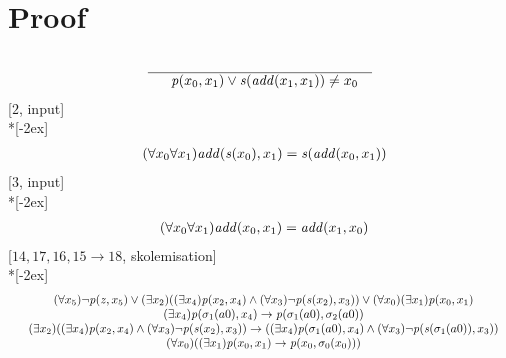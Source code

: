 \documentclass[fleqn]{article}
\newenvironment{VampireProof}{%
   \section{Proof}}{}
\newenvironment{VampireInference}{%
   \begin{array}{c}}{\end{array}}
\newenvironment{VampirePremise}%
   {\begin{array}{l}}%
   {\end{array}}
\newenvironment{VampireConclusion}%
   {\begin{array}{l}}%
   {\end{array}}
\newcommand{\VPremiseSeparator}{\\}
\newcommand{\VConclusionSeparator}{\\ \hline}
\newcommand{\Vor}{\vee}
\newcommand{\Vand}{\wedge}
\newcommand{\Vimp}{\rightarrow}
\begin{document}
\begin{VampireProof}
\[\begin{VampireInference}
\begin{VampirePremise}
\end{VampirePremise}
\VConclusionSeparator
\begin{VampireConclusion}
~~\mathit{p} (x_{0},x_{1}) \Vor \mathit{s} (\mathit{add} (x_{1},x_{1})) \neq x_{0}
\end{VampireConclusion}
\end{VampireInference}
\]
[$2$, input]\\*[-2ex]
\[\begin{VampireInference}
\begin{VampireConclusion}
~~(\forall x_{0} \forall x_{1} )\mathit{add} (\mathit{s} (x_{0}),x_{1}) = \mathit{s} (\mathit{add} (x_{0},x_{1}))
\end{VampireConclusion}
\end{VampireInference}
\]
[$3$, input]\\*[-2ex]
\[\begin{VampireInference}
\begin{VampireConclusion}
~~(\forall x_{0} \forall x_{1} )\mathit{add} (x_{0},x_{1}) = \mathit{add} (x_{1},x_{0})
\end{VampireConclusion}
\end{VampireInference}
\]
[$14,17,16,15\rightarrow 18$, skolemisation]\\*[-2ex]
\[\begin{VampireInference}
\begin{VampirePremise}%
~~(\forall x_{5} )\neg \mathit{p} (\mathit{z},x_{5}) \Vor (\exists x_{2} )((\exists x_{4} )\mathit{p} (x_{2},x_{4}) \Vand (\forall x_{3} )\neg \mathit{p} (\mathit{s} (x_{2}),x_{3})) \Vor (\forall x_{0} )(\exists x_{1} )\mathit{p} (x_{0},x_{1})
\end{VampirePremise}
\VPremiseSeparator
\begin{VampirePremise}%
~~(\exists x_{4} )\mathit{p} (\sigma_{1}(a0),x_{4}) \Vimp \mathit{p} (\sigma_{1}(a0),\sigma_{2}(a0))
\end{VampirePremise}
\VPremiseSeparator
\begin{VampirePremise}%
~~(\exists x_{2} )((\exists x_{4} )\mathit{p} (x_{2},x_{4}) \Vand (\forall x_{3} )\neg \mathit{p} (\mathit{s} (x_{2}),x_{3})) \Vimp ((\exists x_{4} )\mathit{p} (\sigma_{1}(a0),x_{4}) \Vand (\forall x_{3} )\neg \mathit{p} (\mathit{s} (\sigma_{1}(a0)),x_{3}))
\end{VampirePremise}
\VPremiseSeparator
\begin{VampirePremise}%
~~(\forall x_{0} )((\exists x_{1} )\mathit{p} (x_{0},x_{1}) \Vimp \mathit{p} (x_{0},\sigma_{0}(x_{0})))
\end{VampirePremise}

\end{VampireInference}\]
\end{VampireProof}
\end{document}
